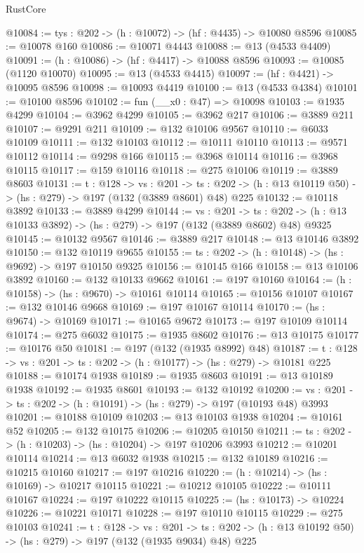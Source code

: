 \begin{lexlean}{RustCore}
\begin{coremodule}
@10084 := {tys : @202} -> (h : @10072) -> (hf : @4435) -> @10080 @8596
@10085 := @10078 @160
@10086 := @10071 @4443
@10088 := @13 (@4533 @4409)
@10091 := (h : @10086) -> (hf : @4417) -> @10088 @8596
@10093 := @10085 (@1120 @10070)
@10095 := @13 (@4533 @4415)
@10097 := (hf : @4421) -> @10095 @8596
@10098 := @10093 @4419
@10100 := @13 (@4533 @4384)
@10101 := @10100 @8596
@10102 := fun (__x0 : @47) => @10098
@10103 := @1935 @4299
@10104 := @3962 @4299
@10105 := @3962 @217
@10106 := @3889 @211
@10107 := @9291 @211
@10109 := @132 @10106 @9567
@10110 := @6033 @10109
@10111 := @132 @10103
@10112 := @10111 @10110
@10113 := @9571 @10112
@10114 := @9298 @166
@10115 := @3968 @10114
@10116 := @3968 @10115
@10117 := @159 @10116
@10118 := @275 @10106
@10119 := @3889 @8603
@10131 := {t : @128} ->
  {vs : @201} ->
  {ts : @202} -> (h : @13 @10119 @50) -> (hs : @279) -> @197 (@132 (@3889 @8601) @48) @225
@10132 := @10118 @3892
@10133 := @3889 @4299
@10144 := {vs : @201} ->
  {ts : @202} -> (h : @13 @10133 @3892) -> (hs : @279) -> @197 (@132 (@3889 @8602) @48) @9325
@10145 := @10132 @9567
@10146 := @3889 @217
@10148 := @13 @10146 @3892
@10150 := @132 @10119 @9655
@10155 := {ts : @202} -> (h : @10148) -> (hs : @9692) -> @197 @10150 @9325
@10156 := @10145 @166
@10158 := @13 @10106 @3892
@10160 := @132 @10133 @9662
@10161 := @197 @10160
@10164 := (h : @10158) -> (hs : @9670) -> @10161 @10114
@10165 := @10156 @10107
@10167 := @132 @10146 @9668
@10169 := @197 @10167 @10114
@10170 := (hs : @9674) -> @10169
@10171 := @10165 @9672
@10173 := @197 @10109 @10114
@10174 := @275 @6032
@10175 := @1935 @8602
@10176 := @13 @10175
@10177 := @10176 @50
@10181 := @197 (@132 (@1935 @8992) @48)
@10187 := {t : @128} -> {vs : @201} -> {ts : @202} -> (h : @10177) -> (hs : @279) -> @10181 @225
@10188 := @10174 @1938
@10189 := @1935 @8603
@10191 := @13 @10189 @1938
@10192 := @1935 @8601
@10193 := @132 @10192
@10200 := {vs : @201} -> {ts : @202} -> (h : @10191) -> (hs : @279) -> @197 (@10193 @48) @3993
@10201 := @10188 @10109
@10203 := @13 @10103 @1938
@10204 := @10161 @52
@10205 := @132 @10175
@10206 := @10205 @10150
@10211 := {ts : @202} -> (h : @10203) -> (hs : @10204) -> @197 @10206 @3993
@10212 := @10201 @10114
@10214 := @13 @6032 @1938
@10215 := @132 @10189
@10216 := @10215 @10160
@10217 := @197 @10216
@10220 := (h : @10214) -> (hs : @10169) -> @10217 @10115
@10221 := @10212 @10105
@10222 := @10111 @10167
@10224 := @197 @10222 @10115
@10225 := (hs : @10173) -> @10224
@10226 := @10221 @10171
@10228 := @197 @10110 @10115
@10229 := @275 @10103
@10241 := {t : @128} ->
  {vs : @201} ->
  {ts : @202} -> (h : @13 @10192 @50) -> (hs : @279) -> @197 (@132 (@1935 @9034) @48) @225

\end{coremodule}
\end{lexlean}
